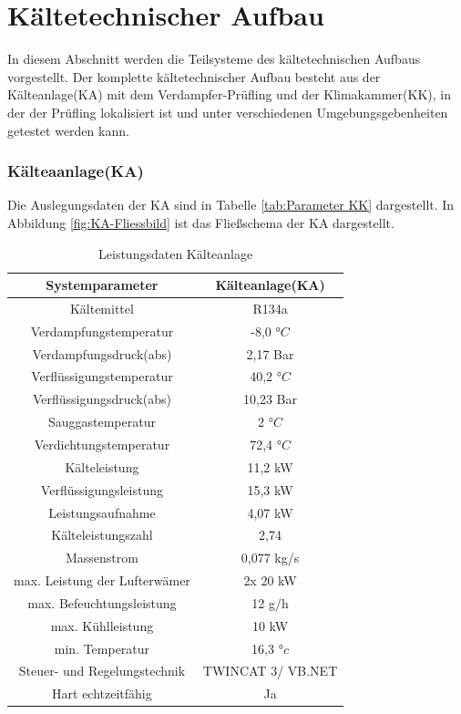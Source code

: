 \section{Kältetechnischer Aufbau}
\label{sec:Kältetechnischer Aufbau}

In diesem Abschnitt werden die Teilsysteme des kältetechnischen Aufbaus vorgestellt. Der komplette kältetechnischer Aufbau besteht aus der Kälteanlage(KA) mit dem Verdampfer-Prüfling und der Klimakammer(KK), in der der Prüfling lokalisiert ist und unter verschiedenen Umgebungsgebenheiten getestet werden kann.

\subsubsection{Kälteaanlage(KA)}
\label{subsec:Kälteanlage}



Die Auslegungsdaten der KA sind in Tabelle \ref{tab:Parameter KK} dargestellt. In Abbildung \ref{fig:KA-Fliessbild}  ist das Fließschema der KA dargestellt. 



\begin{table}[htb]
\centering
\caption{Leistungsdaten Kälteanlage}\vspace{6pt}
\label{tab:Parameter KK}
\begin{tabular}{cc}
\hline 
\textbf{Systemparameter} & \textbf{Kälteanlage(KA)} \\ 
\hline 
\hline
Kältemittel & R134a\\
\hline
Verdampfungstemperatur & -8,0 $°C$\\
\hline
Verdampfungsdruck(abs) & 2,17 Bar\\
\hline
Verflüssigungstemperatur & 40,2 $°C$\\
\hline
Verflüssigungsdruck(abs) & 10,23 Bar\\
\hline
Sauggastemperatur & 2 $°C$\\
\hline
Verdichtungstemperatur &72,4 $°C$\\
Kälteleistung & 11,2 kW \\ 
\hline 
Verflüssigungsleistung & 15,3 kW\\
\hline
Leistungsaufnahme & 4,07 kW \\ 
\hline
Kälteleistungszahl & 2,74\\
\hline 
Massenstrom & 0,077 kg/s \\ 
\hline 
max. Leistung der Lufterwämer & 2x 20 kW \\ 
\hline 
max. Befeuchtungsleistung & 12 g/h \\ 
\hline 
max. Kühlleistung & 10 kW \\ 
\hline 
min. Temperatur & 16,3 $°c$ \\ 
\hline 
Steuer- und Regelungstechnik & TWINCAT 3/ VB.NET \\ 
\hline 
Hart echtzeitfähig & Ja \\ 
\hline 
\end{tabular} 
\label{tab:KA-Auslegungsdaten}
\end{table}

